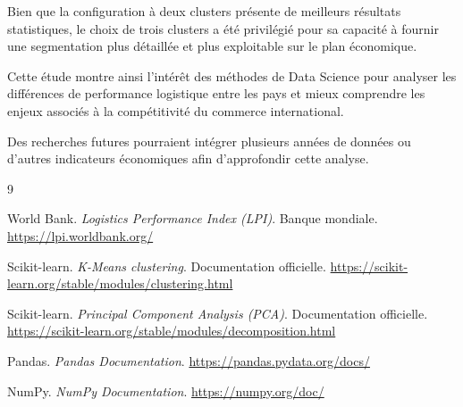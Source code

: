 \documentclass[11pt,a4paper]{article}
\begin{document}
Bien que la configuration à deux clusters présente de
meilleurs résultats statistiques, le choix de trois clusters
a été privilégié pour sa capacité à fournir une segmentation
plus détaillée et plus exploitable sur le plan économique.

Cette étude montre ainsi l'intérêt des méthodes de Data
Science pour analyser les différences de performance
logistique entre les pays et mieux comprendre les enjeux
associés à la compétitivité du commerce international.

Des recherches futures pourraient intégrer plusieurs années
de données ou d'autres indicateurs économiques afin
d'approfondir cette analyse.


\newpage
\begin{thebibliography}{9}

World Bank.
\textit{Logistics Performance Index (LPI)}.
Banque mondiale.
\url{https://lpi.worldbank.org/}

Scikit-learn.
\textit{K-Means clustering}.
Documentation officielle.
\url{https://scikit-learn.org/stable/modules/clustering.html}

Scikit-learn.
\textit{Principal Component Analysis (PCA)}.
Documentation officielle.
\url{https://scikit-learn.org/stable/modules/decomposition.html}

Pandas.
\textit{Pandas Documentation}.
\url{https://pandas.pydata.org/docs/}

NumPy.
\textit{NumPy Documentation}.
\url{https://numpy.org/doc/}

\end{thebibliography}
\end{document}

